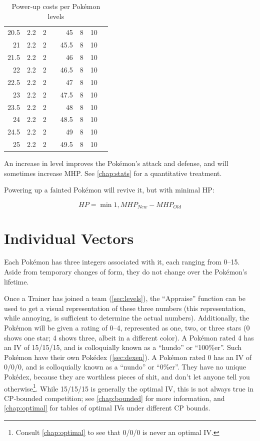 \begin{table}
\begin{center}
\begin{tabular}[ht]{rrrr|rrrr}
     20.5 & 2.2 & 2 & & 45 & 8 & 10 & \\
       21 & 2.2 & 2 & & 45.5 & 8 & 10 & \\
     21.5 & 2.2 & 2 & & 46 & 8 & 10 & \\
       22 & 2.2 & 2 & & 46.5 & 8 & 10 & \\
     22.5 & 2.2 & 2 & & 47 & 8 & 10 & \\
       23 & 2.2 & 2 & & 47.5 & 8 & 10 & \\
     23.5 & 2.2 & 2 & & 48 & 8 & 10 & \\
       24 & 2.2 & 2 & & 48.5 & 8 & 10 & \\
     24.5 & 2.2 & 2 & & 49 & 8 & 10 & \\
       25 & 2.2 & 2 & & 49.5 & 8 & 10 & \\
    \end{tabular}
  \end{center}
  \caption{Power-up costs per Pokémon levels}
  \label{table:powerups}
\end{table}
An increase in level improves the Pokémon's attack and defense, and
  will sometimes increase MHP.
See \autoref{chap:stats} for a quantitative treatment.

Powering up a fainted Pokémon will revive it, but with minimal HP\@:

\[ HP = \min{1, MHP_{New} - MHP_{Old} } \]

\section{Individual Vectors}
\label{sec:ivs}
Each Pokémon has three integers associated with it, each ranging from 0--15.
Aside from temporary changes of form, they do not change over the Pokémon's lifetime.

Once a Trainer has joined a team (\autoref{sec:levels}), the ``Appraise'' function can be used to
  get a visual representation of these three numbers (this representation,
  while annoying, is sufficient to determine the actual numbers).
Additionally, the Pokémon will be given a rating of 0--4, represented as
  one, two, or three stars (0 shows one star; 4 shows three, albeit in a different color).
A Pokémon rated 4 has an IV of 15/15/15, and is colloquially known as a ``hundo'' or ``100\%er''.
Such Pokémon have their own Pokédex (\autoref{sec:dexen}).
A Pokémon rated 0 has an IV of 0/0/0, and is colloquially known as a ``nundo'' or ``0\%er''.
They have no unique Pokédex, because they are worthless pieces of shit,
  and don't let anyone tell you otherwise\footnote{Consult \autoref{chap:optimal}
  to see that 0/0/0 is never an optimal IV.}.
While 15/15/15 is generally the optimal IV, this is not always true in CP-bounded
  competition; see \autoref{chap:bounded} for more information,
  and \autoref{chap:optimal} for tables of optimal IVs under different CP bounds.

